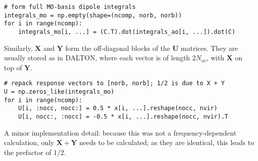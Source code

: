 \begin{verbatim}
# form full MO-basis dipole integrals
integrals_mo = np.empty(shape=(ncomp, norb, norb))
for i in range(ncomp):
    integrals_mo[i, ...] = (C.T).dot(integrals_ao[i, ...]).dot(C)
\end{verbatim}
Similarly, \(\mathbf{X}\) and \(\mathbf{Y}\) form the off-diagonal blocks of the \(\mathbf{U}\) matrices. They are usually stored as in DALTON, where each vector is of length \(2N_{ov}\), with \(\mathbf{X}\) on top of \(\mathbf{Y}\).

\begin{verbatim}
# repack response vectors to [norb, norb]; 1/2 is due to X + Y
U = np.zeros_like(integrals_mo)
for i in range(ncomp):
    U[i, :nocc, nocc:] = 0.5 * x[i, ...].reshape(nocc, nvir)
    U[i, nocc:, :nocc] = -0.5 * x[i, ...].reshape(nocc, nvir).T
\end{verbatim}
A minor implementation detail: because this was not a frequency-dependent calculation, only \(\mathbf{X}+\mathbf{Y}\) needs to be calculated; as they are identical, this leads to the prefactor of 1/2.

